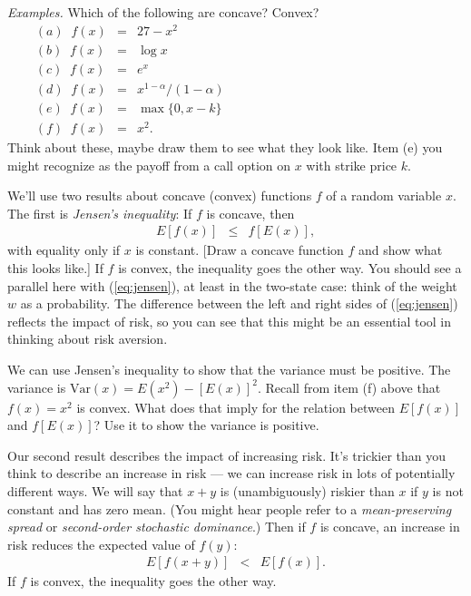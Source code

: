 \documentclass[11pt]{article}
\begin{document}
{\it Examples.\/}
Which of the following are concave?  Convex?
\begin{eqnarray*}
    (a) \;\; f(x) &=& 27 - x^2 \\
    (b) \;\; f(x) &=& \log x  \\
    (c) \;\; f(x) &=& e^x \\
    (d) \;\; f(x) &=& x^{1-\alpha}/(1-\alpha) \\
    (e) \;\; f(x) &=& \max \{ 0, x-k \}  \\
    (f) \;\; f(x) &=& x^2.
    \phantom{xxxxxxxxxxxxxxxxxxxxxxxxxxxxxxxxxxxxxxx}
\end{eqnarray*}
Think about these, maybe draw them to see what they look like.
Item (e) you might recognize as the payoff from
a call option on $x$ with strike price $k$.


We'll use two results about concave (convex) functions $f$
of a random variable $x$.
The first is {\it Jensen's inequality\/}:
If $f$ is concave, then
\begin{eqnarray}
    E [f(x)] &\leq& f [E(x)] ,
    \label{eq:jensen}
\end{eqnarray}
with equality only if $x$ is constant.
[Draw a concave function $f$ and show what this looks like.]
If $f$ is convex, the inequality goes the other way.
You should see a parallel here with (\ref{eq:jensen}), at least in the two-state case:
think of the weight $w$ as a probability.
The difference between the left and right sides of (\ref{eq:jensen}) reflects
the impact of risk, so you can see that this might be
an essential tool in thinking about risk aversion.

We can use Jensen's inequality to show that the variance must be positive.
The variance is $\mbox{Var}(x) = E(x^2) - [E(x)]^2$.
Recall from item (f) above that $f(x) = x^2$ is convex.
What does that imply for the relation between $E[f(x)]$ and $f[E(x)]$?
Use it to show the variance is positive.

Our second result describes the impact of increasing risk.
It's trickier than you think to describe an increase in risk ---
we can increase risk in lots of potentially different ways.
We will say that $ x+y$ is (unambiguously) riskier than $x$ if $y$ is not constant and has zero mean.
(You might hear people refer to a {\it mean-preserving spread\/} or
{\it second-order stochastic dominance\/}.)
Then if $f$ is concave, an increase in risk reduces the expected value of $f(y)$:
\begin{eqnarray*}
    E[ f(x + y)] &<& E[f(x)] .
\end{eqnarray*}
If $f$ is convex, the inequality goes the other way.
\end{document}
